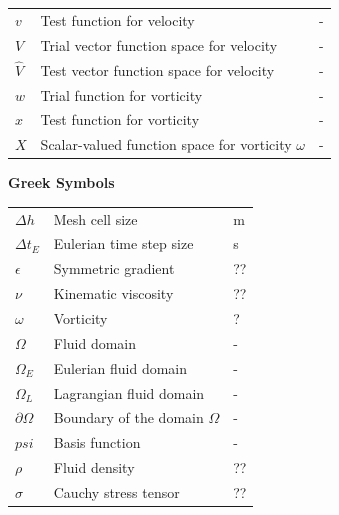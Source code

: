 {\begin{longtable}{p{1.5cm}p{10.5cm}p{1.5cm}}
 	$v$ & Test function for velocity& -\\				
 	$V$ & Trial vector function space for velocity& - \\
 	$\hat{V}$ & Test vector function space for velocity& -\\
 

	 $w$ & Trial function for vorticity & -\\
	 
	 $x$ & Test function for vorticity & -\\
	 $X$ & Scalar-valued function space for vorticity $\omega$ & -\\
\end{longtable}}

{\textbf{\textsf{Greek Symbols}}}

{\renewcommand{\arraystretch}{1.2} %
\begin{longtable}{p{1.5cm}p{10.5cm}p{1.5cm}}

	$\Delta h$ & Mesh cell size & \si{m} \\
	$\Delta t_E$ & Eulerian time step size & \si{s} \\
	
	$\epsilon$ & Symmetric gradient & ??\\
	
	$\nu$ & Kinematic viscosity & ??\\

	$\omega$ & Vorticity & ?\\
	$\Omega$ & Fluid domain & -\\	
	$\Omega_E$ & Eulerian fluid domain & -\\	
	$\Omega_L$ & Lagrangian fluid domain & -\\
	$\partial \Omega$ & Boundary of the domain $\Omega$ & -\\
	
	$psi$ & Basis function & -\\
	$\rho$ & Fluid density & ??\\
	
	$\sigma$ & Cauchy stress tensor & ??\\
\end{longtable}}
					
